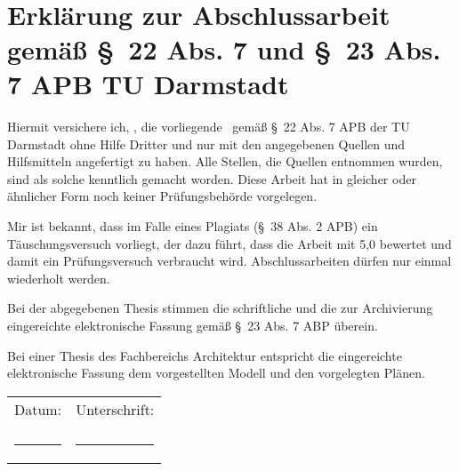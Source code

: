 \ \\[3cm]	%

\section*{Erkl\"arung zur Abschlussarbeit gem\"aß \S\ 22 Abs. 7 und \S\ 23 Abs. 7 APB TU Darmstadt}
\noindent
Hiermit versichere ich, \SADAAutor, die vorliegende \SADATyp\ gem\"aß \S\ 22 Abs. 7 APB der TU Darmstadt ohne Hilfe Dritter und nur mit den angegebenen Quellen und Hilfsmitteln angefertigt zu haben. Alle Stellen, die Quellen entnommen wurden, sind als solche kenntlich gemacht worden. Diese Arbeit hat in gleicher oder \"ahnlicher  Form noch keiner Pr\"ufungsbeh\"orde  vorgelegen. 

Mir ist bekannt, dass im Falle eines Plagiats (\S\ 38 Abs. 2 APB) ein T\"auschungsversuch vorliegt, der dazu f\"uhrt, dass die Arbeit mit 5,0 bewertet und damit ein Pr\"ufungsversuch verbraucht wird. Abschlussarbeiten d\"urfen nur einmal wiederholt werden.

Bei der abgegebenen Thesis stimmen die schriftliche und die zur Archivierung eingereichte elektronische Fassung gem\"aß \S\ 23 Abs. 7 ABP \"uberein.

Bei einer Thesis des Fachbereichs Architektur entspricht die eingereichte elektronische Fassung dem vorgestellten Modell und den vorgelegten Pl\"anen.
\vspace*{20mm} \\
\noindent
\begin{tabular}{ll}
	Datum: & Unterschrift: \\
	 & \\
	\rule{0.3\textwidth}{0.4pt}	& \rule{0.4\textwidth}{0.4pt}\\
\end{tabular}
	
\vspace{40mm}
\noindent


